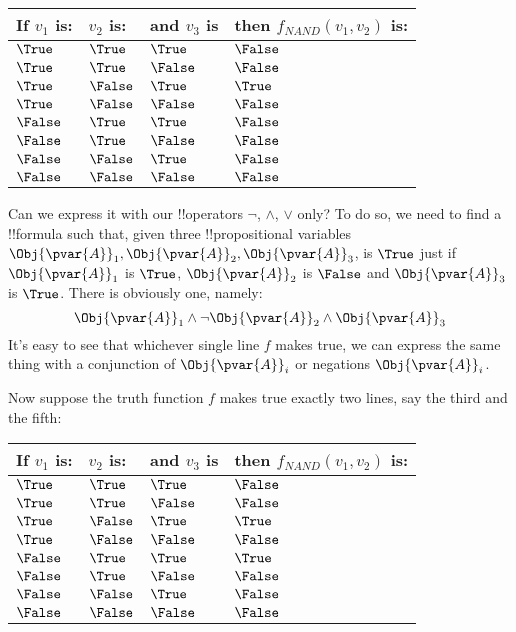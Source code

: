 \documentclass[../../../include/open-logic-section]{subfiles}
\begin{document}
\smallskip \noindent
\begin{tabular}{llll}
    If $v_1$ is: & $v_2$ is: & and $v_3$ is & then $f_{NAND}(v_1,v_2)$ is: \\
    \hline
    $\True$ & $\True$ & $\True$ & $\False$ \\
    $\True$ & $\True$ & $\False$ & $\False$ \\
    $\True$ & $\False$ & $\True$ & $\True$ \\
    $\True$ & $\False$ & $\False$ & $\False$  \\
    $\False$ & $\True$ & $\True$ & $\False$  \\
    $\False$ & $\True$ & $\False$ & $\False$  \\
    $\False$ & $\False$ & $\True$ & $\False$  \\
    $\False$ & $\False$ & $\False$ & $\False$  \\
\end{tabular}
\smallskip

Can we express it with our !!{operator}s $\lnot$, $\land$, $\lor$ only?
To do so, we need to find a !!{formula} such that, given three
!!{propositional variable}s
$\Obj{\pvar{A}}_1,\Obj{\pvar{A}}_2,\Obj{\pvar{A}}_3$, is $\True$ just
if $\Obj{\pvar{A}}_1$ is $\True$, $\Obj{\pvar{A}}_2$ is $\False$ and
$\Obj{\pvar{A}}_3$ is $\True$. There is obviously one, namely:
$$\Obj{\pvar{A}}_1\land\lnot\Obj{\pvar{A}}_2\land\Obj{\pvar{A}}_3$$
It's easy to see that whichever single line $f$ makes true, we can
express the same thing with a conjunction of $\Obj{\pvar{A}}_i$ or 
negations $\Obj{\pvar{A}}_i$.

Now suppose the truth function $f$ makes true exactly two lines, say
the third and the fifth:

\smallskip\noindent
\begin{tabular}{llll}
    If $v_1$ is: & $v_2$ is: & and $v_3$ is & then $f_{NAND}(v_1,v_2)$ is: \\
    \hline
    $\True$ & $\True$ & $\True$ & $\False$ \\
    $\True$ & $\True$ & $\False$ & $\False$ \\
    $\True$ & $\False$ & $\True$ & $\True$ \\
    $\True$ & $\False$ & $\False$ & $\False$  \\
    $\False$ & $\True$ & $\True$ & $\True$  \\
    $\False$ & $\True$ & $\False$ & $\False$  \\
    $\False$ & $\False$ & $\True$ & $\False$  \\
    $\False$ & $\False$ & $\False$ & $\False$  \\
\end{tabular}
\smallskip
\end{document}
